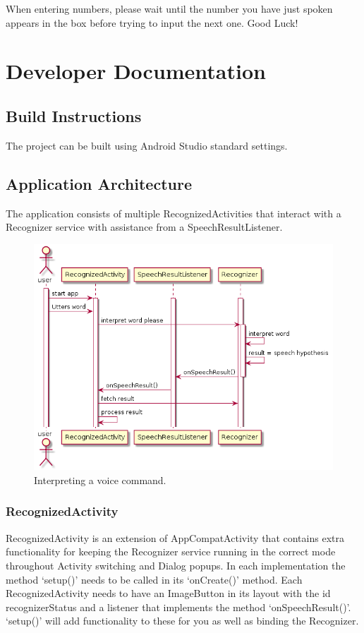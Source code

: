 \documentclass[11pt, oneside]{article}
\begin{document}
When entering numbers, please wait until the number you have just spoken appears
in the box before trying to input the next one.
Good Luck!

\pagebreak

\section{Developer Documentation}

\subsection{Build Instructions}
The project can be built using Android Studio standard settings.

\subsection{Application Architecture}
The application consists of multiple RecognizedActivities that
interact with a Recognizer service with assistance from a
SpeechResultListener.

\begin{figure}[!h]
	\includegraphics[width=0.7\columnwidth]{speechsequence}
	\caption{Interpreting a voice command.}
\end{figure}

\subsubsection{RecognizedActivity}
RecognizedActivity is an extension of AppCompatActivity that contains
extra functionality for keeping the Recognizer service running in the
correct mode throughout Activity switching and Dialog popups. In each
implementation the method `setup()' needs to be called in its
`onCreate()' method. Each RecognizedActivity needs to have an
ImageButton in its layout with the id recognizerStatus and a listener
that implements the method `onSpeechResult()'. `setup()' will add
functionality to these for you as well as binding the Recognizer.
\end{document}

